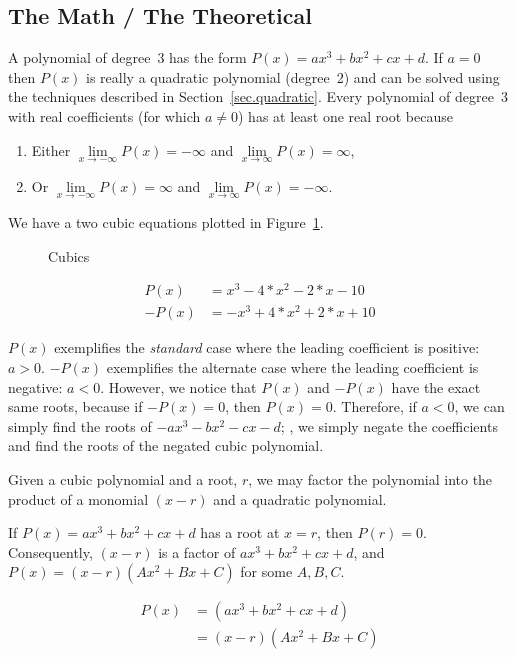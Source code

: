 \subsection{The Math / The Theoretical}
\label{sec.cubic.math}
A polynomial of degree~3 has the form $P(x) = a x^3 + b x^2 + c x +d$.
If $a=0$ then $P(x)$ is really a quadratic polynomial (degree~2)
and can be solved using the techniques described in
Section~\ref{sec.quadratic}.  Every polynomial of degree~3 with real
coefficients (for which $a\neq 0$) has at least one real root because
\begin{enumerate}
\item Either $\lim\limits_{x\to-\infty}P(x) = -\infty$ and $\lim\limits_{x\to\infty}P(x) = \infty$,
  \item Or $\lim\limits_{x\to-\infty}P(x) = \infty$ and $\lim\limits_{x\to\infty}P(x) = -\infty$.
\end{enumerate}


We have a two cubic equations plotted in Figure~\ref{fig.cubic}.

\begin{figure}
  \centering

  \caption{Cubics}
  \label{fig.cubic}
\end{figure}

\begin{align*}
  P(x) &= x^3 - 4*x^2 - 2*x - 10\\
  -P(x) &= -x^3 + 4*x^2 + 2*x + 10
\end{align*}

$P(x)$ exemplifies the \emph{standard} case where the leading coefficient is positive: $a>0$.
$-P(x)$ exemplifies the alternate case where the leading coefficient is negative: $a<0$.
However, we notice that $P(x)$ and $-P(x)$ have the exact same roots, because if $-P(x) = 0$,
then $P(x) = 0$.  Therefore, if $a<0$, we can simply find the roots of $-a x^3 -b x^2 - c x - d$;
\ie, we simply negate the coefficients and find the roots of the negated cubic polynomial.




Given a cubic polynomial and a root, $r$, we may factor the polynomial into
the product of a monomial $(x-r)$ and a quadratic polynomial.

If $P(x) = a x^3 + b x^2 + c x + d$ has a root at $x=r$, then $P(r)=0$.
Consequently, $(x-r)$ is a factor of $a x^3 + b x^2 + c x + d$, and
$P(x) = (x-r)(A x^2 + B x + C)$ for some $A, B, C$.  

\begin{align}
  P(x) &=  (a x^3 + b x^2 + c x + d)\nonumber\\
  &= (x-r) (A x^2 + B x + C)\label{eq.factor.ABC}
\end{align}

